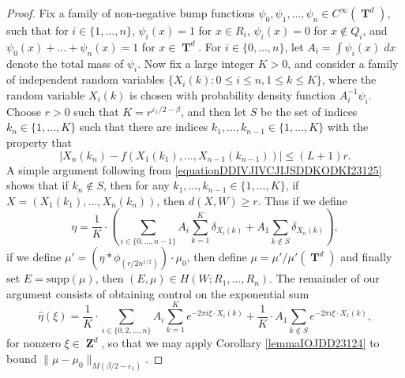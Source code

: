 \documentclass[dvipsnames,letterpaper,12pt]{article}
\numberwithin{equation}{section}
\DeclareMathOperator{\ZZ}{\mathbf{Z}}
\DeclareMathOperator{\TT}{\mathbf{T}}
\numberwithin{theorem}{section}
\begin{document}
\begin{proof}
    Fix a family of non-negative bump functions $\psi_0,\psi_1,\dots,\psi_n \in C^\infty(\TT^d)$, such that for $i \in \{ 1,\dots,n \}$, $\psi_i(x) = 1$ for $x \in R_i$, $\psi_i(x) = 0$ for $x \not \in Q_i$, and $\psi_0(x) + \dots + \psi_n(x) = 1$ for $x \in \TT^d$. For $i \in \{ 0, \dots, n \}$, let $A_i = \int \psi_i(x)\; dx$ denote the total mass of $\psi_i$. Now fix a large integer $K > 0$, and consider a family of independent random variables $\{ X_i(k) : 0 \leq i \leq n, 1 \leq k \leq K \}$, where the random variable $X_i(k)$ is chosen with probability density function $A_i^{-1} \psi_i$. Choose $r > 0$ such that $K = r^{\varepsilon_1/2-\beta}$,
    and then let $S$ be the set of indices $k_n \in \{ 1, \dots, K \}$ such that there are indices $k_1,\dots,k_{n-1} \in \{ 1,\dots,K \}$ with the property that
    \begin{equation} \label{equationDDIVJIVCJIJSDDKODKI23125}
        |X_n(k_n) - f(X_1(k_1),\dots,X_{n-1}(k_{n-1}))| \leq (L+1)r.
    \end{equation}
    A simple argument following from \eqref{equationDDIVJIVCJIJSDDKODKI23125} shows that if $k_n \not \in S$, then for any $k_1,\dots,k_{n-1} \in \{ 1, \dots, K \}$, if $X = (X_1(k_1),\dots,X_n(k_n))$, then $d(X,W) \geq r$. Thus if we define
    \[ \eta = \frac{1}{K} \cdot \left( \sum_{i \in \{ 0, \dots, n-1 \}} A_i \sum_{k = 1}^K \delta_{X_i(k)} + A_1 \sum_{k \not \in S} \delta_{X_n(k)} \right), \]
    if we define $\mu' = (\eta * \phi_{(r/2n^{1/2})}) \cdot \mu_0$, then define $\mu = \mu'/\mu'(\TT^d)$ and finally set $E = \text{supp}(\mu)$, then $(E,\mu) \in H(W;R_1,\dots,R_n)$. The remainder of our argument consists of obtaining control on the exponential sum
    \begin{equation} \label{equationIODJOIVJIO}
        \widehat{\eta}(\xi) = \frac{1}{K} \cdot \sum_{i \in \{ 0, 2, \dots, n \}} A_i \sum_{k = 1}^K e^{-2 \pi i \xi \cdot X_i(k)} + \frac{1}{K} \cdot A_1 \sum_{k \not \in S} e^{-2 \pi i \xi \cdot X_1(k)},
    \end{equation}
    for nonzero $\xi \in \ZZ^d$, so that we may apply Corollary \ref{lemmaIOJDD23124} to bound $\| \mu - \mu_0 \|_{M(\beta/2-\varepsilon_1)}$.


\end{proof}
\end{document}
